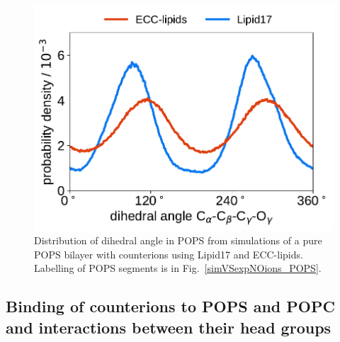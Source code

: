 \documentclass[journal=jpcbfk,manuscript=article]{achemso}
\newlength{\figwidth}
\begin{document}
\begin{figure}[tbp!] 
  \centering 
  \includegraphics[width=\figwidth]{../img/dihedral_angle_distribution_Ca-Cb-Cg-Og_ECC-L17.pdf}
  \caption{\label{fig:dihedral}
    Distribution of dihedral angle  in POPS 
    from simulations of a pure POPS bilayer with  counterions using Lipid17 and ECC-lipids. 
    Labelling of POPS segments is in Fig.~\ref{simVSexpNOions_POPS}. 
}
\end{figure} 



 
\subsection{Binding of counterions to POPS and POPC and interactions between their head groups}
\end{document}
